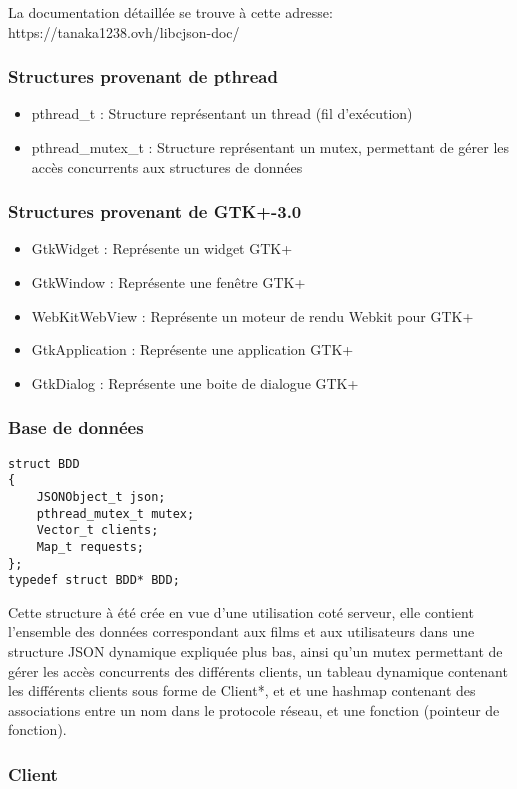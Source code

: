 La documentation détaillée se trouve à cette adresse:\newline
https://tanaka1238.ovh/libcjson-doc/

\subsubsection{Structures provenant de pthread}
\begin{itemize}
	\item pthread\_t : Structure représentant un thread (fil d'exécution)
	\item pthread\_mutex\_t : Structure représentant un mutex, permettant de gérer les accès concurrents aux structures de données
\end{itemize}
\subsubsection{Structures provenant de GTK+-3.0}
\begin{itemize}
	\item GtkWidget : Représente un widget GTK+
	\item GtkWindow : Représente une fenêtre GTK+
	\item WebKitWebView : Représente un moteur de rendu Webkit pour GTK+
	\item GtkApplication : Représente une application GTK+
	\item GtkDialog : Représente une boite de dialogue GTK+
\end{itemize}
\subsubsection{Base de données}
\begin{lstlisting}
struct BDD
{
	JSONObject_t json;
	pthread_mutex_t mutex;
	Vector_t clients;
	Map_t requests;
};
typedef struct BDD* BDD;
\end{lstlisting}
Cette structure à été crée en vue d'une utilisation coté serveur, elle contient l'ensemble des données correspondant aux films et aux utilisateurs dans une structure JSON dynamique expliquée plus bas, ainsi qu'un mutex permettant de gérer les accès concurrents des différents clients, un tableau dynamique contenant les différents clients sous forme de Client*, et et une hashmap contenant des associations entre un nom dans le protocole réseau, et une fonction (pointeur de fonction).

\subsubsection{Client}

